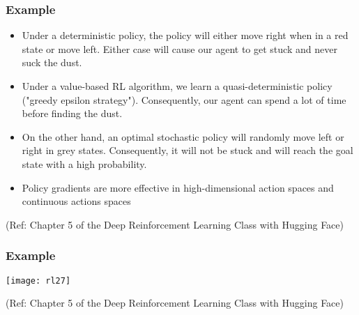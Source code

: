 \begin{frame}[fragile]\frametitle{Example  }

\begin{itemize}
\item Under a deterministic policy, the policy will either move right when in a red state or move left. Either case will cause our agent to get stuck and never suck the dust.

\item Under a value-based RL algorithm, we learn a quasi-deterministic policy ("greedy epsilon strategy"). Consequently, our agent can spend a lot of time before finding the dust.

\item On the other hand, an optimal stochastic policy will randomly move left or right in grey states. Consequently, it will not be stuck and will reach the goal state with a high probability.

\item Policy gradients are more effective in high-dimensional action spaces and continuous actions spaces
\end{itemize}

{\tiny (Ref: Chapter 5 of the Deep Reinforcement Learning Class with Hugging Face)}

\end{frame}

\begin{frame}[fragile]\frametitle{Example  }


\begin{center}
\texttt{[image: rl27]}
\end{center}

{\tiny (Ref: Chapter 5 of the Deep Reinforcement Learning Class with Hugging Face)}

\end{frame}

